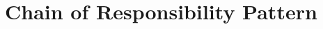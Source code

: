 \documentclass[a4paper]{article}
\begin{document}
\setcounter{page}{1} 

\newpage

\tableofcontents
\newpage


\newpage

 \section{Chain of Responsibility Pattern}
 
 
 
 
 

 \newpage


\newpage

% 
\end{document}
